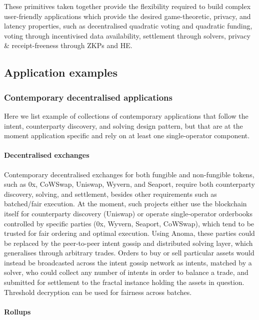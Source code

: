 These primitives taken together provide the flexibility required to
build complex user-friendly applications which provide the desired
game-theoretic, privacy, and latency properties, such as decentralised
quadratic voting and quadratic funding, voting through incentivised data
availability, settlement through solvers, privacy \& receipt-freeness
through ZKPs and HE.

\subsection{Application examples}\label{application-examples}

\subsubsection{Contemporary decentralised
applications}\label{contemporary-decentralised-applications}

Here we list example of collections of contemporary applications that
follow the intent, counterparty discovery, and solving design pattern,
but that are at the moment application specific and rely on at least one
single-operator component.

\paragraph{Decentralised exchanges}\label{decentralised-exchanges}

Contemporary decentralised exchanges for both fungible and non-fungible
tokens, such as 0x, CoWSwap, Uniswap, Wyvern, and Seaport, require both
counterparty discovery, solving, and settlement, besides other
requirements such as batched/fair execution. At the moment, such
projects either use the blockchain itself for counterparty discovery
(Uniswap) or operate single-operator orderbooks controlled by specific
parties (0x, Wyvern, Seaport, CoWSwap), which tend to be trusted for
fair ordering and optimal execution. Using Anoma, these parties could be
replaced by the peer-to-peer intent gossip and distributed solving
layer, which generalises through arbitrary trades. Orders to buy or sell
particular assets would instead be broadcasted across the intent gossip
network as intents, matched by a solver, who could collect any number of
intents in order to balance a trade, and submitted for settlement to the
fractal instance holding the assets in question. Threshold decryption
can be used for fairness across batches.

\paragraph{Rollups}\label{rollups}

